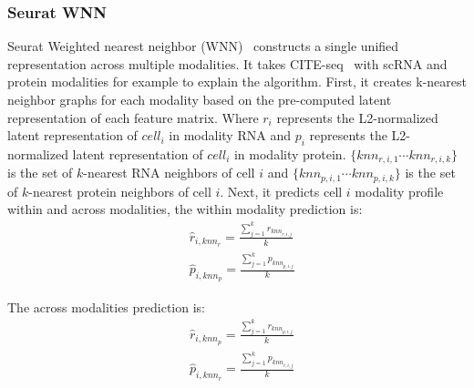 \subsubsection{Seurat WNN}
Seurat Weighted nearest neighbor (WNN)~\citep{hao2021seurat4} constructs a single unified representation across multiple modalities. It takes CITE-seq~\cite{citeseq2017} with scRNA and protein modalities for example to explain the algorithm. First, it creates k-nearest neighbor graphs for each modality based on the pre-computed latent representation of each feature matrix. Where $r_i$ represents the L2-normalized latent representation of $cell_i$ in modality RNA and $p_i$ represents the L2-normalized latent representation of $cell_i$ in modality protein. $\{knn_{r,i,1}\cdots knn_{r,i,k}\}$ is the set of $k$-nearest RNA neighbors of cell $i$ and $\{knn_{p,i,1}\cdots knn_{p,i,k}\}$ is the set of $k$-nearest protein neighbors of cell $i$. Next, it predicts cell $i$ modality profile within and across modalities, the within modality prediction is:
\begin{equation}
	\begin{aligned}
		&\hat{r}_{i, knn_r}=\frac{\sum_{j=1}^{k} r_{k n n_{r, i, j}}}{k} \\
		&\hat{p}_{i, knn_p}=\frac{\sum_{j=1}^{k} p_{k n n_{p, i, j}}}{k} 
	\end{aligned}
\end{equation}

The across modalities prediction is:
\begin{equation}
	\begin{aligned}
		&\hat{r}_{i, knn_p}=\frac{\sum_{j=1}^{k} r_{k n n_{p, i, j}}}{k} \\
		&\hat{p}_{i, knn_r}=\frac{\sum_{j=1}^{k} p_{k n n_{r, i, j}}}{k}
	\end{aligned}
\end{equation}

